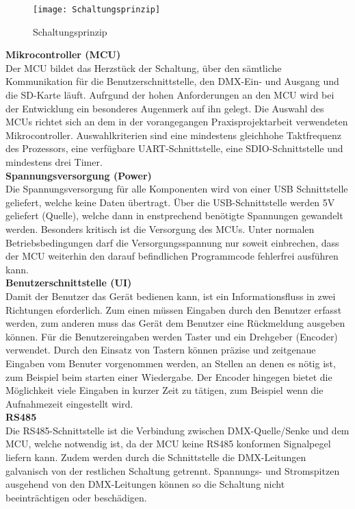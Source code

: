 \vspace*{5mm}
\begin{figure}[h]
	\texttt{[image: Schaltungsprinzip]}
	\caption{Schaltungsprinzip}
	\label{fig:Schaltungsrinzip}
\end{figure}
\hspace*{-5mm}\textbf{Mikrocontroller (MCU)}\\
Der MCU bildet das Herzstück der Schaltung, über den sämtliche Kommunikation für die Benutzerschnittstelle, den DMX-Ein- und Ausgang und die SD-Karte läuft. Aufrgund der hohen Anforderungen an den MCU wird bei der Entwicklung ein besonderes Augenmerk auf ihn gelegt. Die Auswahl des MCUs richtet sich an dem in der vorangegangen Praxisprojektarbeit verwendeten Mikrocontroller. Auswahlkriterien sind eine mindestens gleichhohe Taktfrequenz des Prozessors, eine verfügbare UART-Schnittstelle, eine SDIO-Schnittstelle und mindestens drei Timer.\\
\textbf{Spannungsversorgung (Power)}\\
Die Spannungsversorgung für alle Komponenten wird von einer USB Schnittstelle geliefert, welche keine Daten übertragt. Über die USB-Schnittstelle werden 5V geliefert (Quelle), welche dann in enstprechend benötigte Spannungen gewandelt werden. Besonders kritisch ist die Versorgung des MCUs. Unter normalen Betriebsbedingungen darf die Versorgungsspannung nur soweit einbrechen, dass der MCU weiterhin den darauf befindlichen Programmcode fehlerfrei ausführen kann.\\
\textbf{Benutzerschnittstelle (UI)}\\
Damit der Benutzer das Gerät bedienen kann, ist ein Informationsfluss in zwei Richtungen eforderlich. Zum einen müssen Eingaben durch den Benutzer erfasst werden, zum anderen muss das Gerät dem Benutzer eine Rückmeldung ausgeben können. Für die Benutzereingaben werden Taster und ein Drehgeber (Encoder) verwendet. Durch den Einsatz von Tastern können präzise und zeitgenaue Eingaben vom Benuter vorgenommen werden, an Stellen an denen es nötig ist, zum Beispiel beim starten einer Wiedergabe. Der Encoder hingegen bietet die Möglichkeit viele Eingaben in kurzer Zeit zu tätigen, zum Beispiel wenn die Aufnahmezeit eingestellt wird.\\
\textbf{RS485}\\
Die RS485-Schnittstelle ist die Verbindung zwischen DMX-Quelle/Senke und dem MCU, welche notwendig ist, da der MCU keine RS485 konformen Signalpegel liefern kann. Zudem werden durch die Schnittstelle die DMX-Leitungen galvanisch von der restlichen Schaltung getrennt. Spannungs- und Stromspitzen ausgehend von den DMX-Leitungen können so die Schaltung nicht beeinträchtigen oder beschädigen.\\
